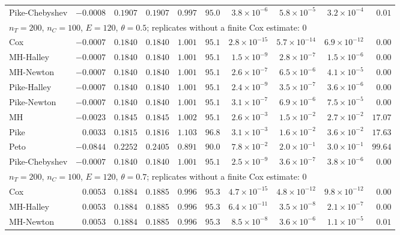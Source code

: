 \begin{landscape}
\begin{longtable}{lrrrrrrrrr}
Pike-Chebyshev & $-0.0008$ & $0.1907$ & $0.1907$ & $0.997$ & $95.0$ & $3.8 \times 10^{-6}$ & $5.8 \times 10^{-5}$ & $3.2 \times 10^{-4}$ & $0.01$ \\
\multicolumn{10}{l}{$n_T = 200$, $n_C = 100$, $E = 120$, $\theta = 0.5$; replicates without a finite Cox estimate: 0} \\
Cox & $-0.0007$ & $0.1840$ & $0.1840$ & $1.001$ & $95.1$ & $2.8 \times 10^{-15}$ & $5.7 \times 10^{-14}$ & $6.9 \times 10^{-12}$ & $0.00$ \\
MH-Halley & $-0.0007$ & $0.1840$ & $0.1840$ & $1.001$ & $95.1$ & $1.5 \times 10^{-9}$ & $2.8 \times 10^{-7}$ & $1.5 \times 10^{-6}$ & $0.00$ \\
MH-Newton & $-0.0007$ & $0.1840$ & $0.1840$ & $1.001$ & $95.1$ & $2.6 \times 10^{-7}$ & $6.5 \times 10^{-6}$ & $4.1 \times 10^{-5}$ & $0.00$ \\
Pike-Halley & $-0.0007$ & $0.1840$ & $0.1840$ & $1.001$ & $95.1$ & $2.4 \times 10^{-9}$ & $3.5 \times 10^{-7}$ & $3.6 \times 10^{-6}$ & $0.00$ \\
Pike-Newton & $-0.0007$ & $0.1840$ & $0.1840$ & $1.001$ & $95.1$ & $3.1 \times 10^{-7}$ & $6.9 \times 10^{-6}$ & $7.5 \times 10^{-5}$ & $0.00$ \\
MH & $-0.0023$ & $0.1845$ & $0.1845$ & $1.002$ & $95.1$ & $2.6 \times 10^{-3}$ & $1.5 \times 10^{-2}$ & $2.7 \times 10^{-2}$ & $17.07$ \\
Pike & $0.0033$ & $0.1815$ & $0.1816$ & $1.103$ & $96.8$ & $3.1 \times 10^{-3}$ & $1.6 \times 10^{-2}$ & $3.6 \times 10^{-2}$ & $17.63$ \\
Peto & $-0.0844$ & $0.2252$ & $0.2405$ & $0.891$ & $90.0$ & $7.8 \times 10^{-2}$ & $2.0 \times 10^{-1}$ & $3.0 \times 10^{-1}$ & $99.64$ \\
Pike-Chebyshev & $-0.0007$ & $0.1840$ & $0.1840$ & $1.001$ & $95.1$ & $2.5 \times 10^{-9}$ & $3.6 \times 10^{-7}$ & $3.8 \times 10^{-6}$ & $0.00$ \\
\multicolumn{10}{l}{$n_T = 200$, $n_C = 100$, $E = 120$, $\theta = 0.7$; replicates without a finite Cox estimate: 0} \\
Cox & $0.0053$ & $0.1884$ & $0.1885$ & $0.996$ & $95.3$ & $4.7 \times 10^{-15}$ & $4.8 \times 10^{-12}$ & $9.8 \times 10^{-12}$ & $0.00$ \\
MH-Halley & $0.0053$ & $0.1884$ & $0.1885$ & $0.996$ & $95.3$ & $6.4 \times 10^{-11}$ & $3.5 \times 10^{-8}$ & $2.1 \times 10^{-7}$ & $0.00$ \\
MH-Newton & $0.0053$ & $0.1884$ & $0.1885$ & $0.996$ & $95.3$ & $8.5 \times 10^{-8}$ & $3.6 \times 10^{-6}$ & $1.1 \times 10^{-5}$ & $0.01$ \\

\end{longtable}
\end{landscape}
